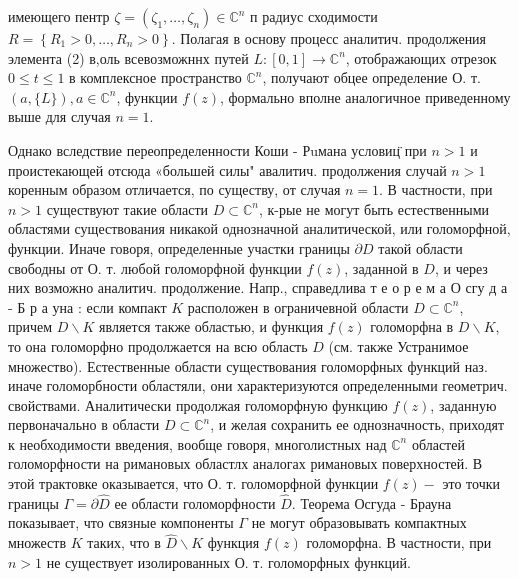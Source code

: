 \documentclass[10pt]{article}
\begin{document}
имеющего пентр $\zeta=\left(\zeta_{1}, \ldots, \zeta_{n}\right) \in \mathbb{C}^{n}$ п радиус сходимости $R=\left\{R_{1}>0, \ldots, R_{n}>0\right\}$. Полагая в основу процесс аналитич. продолжения элемента (2) в,оль всевозможннх путей $L:[0,1] \rightarrow \mathbb{C}^{n}$, отображающих отрезок $0 \leqslant t \leqslant 1$ в комплексное пространство $\mathbb{C}^{n}$, получают обцее определение О. т. $(a,\{L\}), a \in \mathbb{C}^{n}$, функции $f(z)$, формально вполне аналогичное приведенному выше для случая $n=1$.



Однако вследствие переопределенности Коши - Рuмана условиц̈ при $n>1$ и проистекающей отсюда «большей силы" авалитич. продолжения случай $n>1$ коренным образом отличается, по существу, от случая $n=1$. В частности, при $n>1$ существуют такие области $D \subset \mathbb{C}^{n}$, к-рые не могут быть естественными областями существования никакой однозначной аналитической, или голоморфной, функции. Иначе говоря, определенные участки границы $\partial D$ такой области свободны от О. т. любой голоморфной функции $f(z)$, заданной в $D$, и через них возможно аналитич. продолжение. Напр., справедлива т е о р е м а О сгу д а - Б р а уна : если компакт $K$ расположен в ограничевной области $D \subset \mathbb{C}^{n}$, причем $D \backslash K$ является также областью, и функция $f(z)$ голоморфна в $D \backslash K$, то она голоморфно продолжается на всю область $D$ (см. также Устранимое множество). Естественные области существования голоморфных функций наз. иначе голоморбности областяли, они характеризуются определенными геометрич. свойствами. Аналитически продолжая голоморфную функцию $f(z)$, заданную первоначально в области $D \subset \mathbb{C}^{n}$, и желая сохранить ее однозначность, приходят к необходимости введения, вообще говоря, многолистных над $\mathbb{C}^{n}$ областей голоморфности на римановых областлх аналогах римановых поверхностей. В этой трактовке оказывается, что О. т. голоморфной функции $f(z)-$ это точки границы $\Gamma=\partial \hat{D}$ ее области голоморфности $\hat{D}$. Теорема Осгуда - Брауна показывает, что связные компоненты $\Gamma$ не могут образовывать компактных множеств $K$ таких, что в $\hat{D} \backslash K$ функция $f(z)$ голоморфна. В частности, при $n>1$ не существует изолированных О. т. голоморфных функций.
\end{document}
